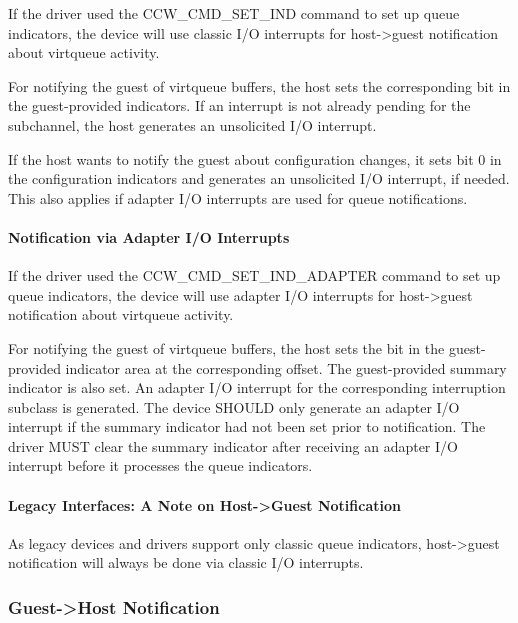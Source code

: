 If the driver used the CCW_CMD_SET_IND command to set up queue
indicators, the device will use classic I/O interrupts for
host->guest notification about virtqueue activity.

For notifying the guest of virtqueue buffers, the host sets the
corresponding bit in the guest-provided indicators. If an
interrupt is not already pending for the subchannel, the host
generates an unsolicited I/O interrupt.

If the host wants to notify the guest about configuration
changes, it sets bit 0 in the configuration indicators and
generates an unsolicited I/O interrupt, if needed. This also
applies if adapter I/O interrupts are used for queue notifications.

\paragraph{Notification via Adapter I/O Interrupts}\label{sec:Virtio Transport Options / Virtio over channel I/O / Device Operation / Host->Guest Notification / Notification via Adapter I/O Interrupts}

If the driver used the CCW_CMD_SET_IND_ADAPTER command to set up
queue indicators, the device will use adapter I/O interrupts for
host->guest notification about virtqueue activity.

For notifying the guest of virtqueue buffers, the host sets the
bit in the guest-provided indicator area at the corresponding offset.
The guest-provided summary indicator is also set. An adapter I/O
interrupt for the corresponding interruption subclass is generated.
The device SHOULD only generate an adapter I/O interrupt if the
summary indicator had not been set prior to notification. The driver
MUST clear the summary indicator after receiving an adapter I/O
interrupt before it processes the queue indicators.

\paragraph{Legacy Interfaces: A Note on Host->Guest Notification}\label{sec:Virtio Transport Options / Virtio over channel I/O / Device Operation / Host->Guest Notification / Legacy Interfaces: A Note on Host->Guest Notification}

As legacy devices and drivers support only classic queue indicators,
host->guest notification will always be done via classic I/O interrupts.

\subsubsection{Guest->Host Notification}\label{sec:Virtio Transport Options / Virtio over channel I/O / Device Operation / Guest->Host Notification}

